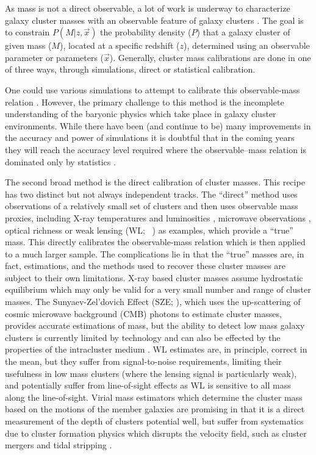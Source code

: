 \documentclass[fleqn,usenatbib]{mnras}
\begin{document}
As mass is not a direct observable, a lot of work is underway to characterize galaxy cluster masses with an observable feature of galaxy clusters . The goal is to constrain $P(M|z, \vec{x})$ the probability density ($P$) that a galaxy cluster of given mass ($M$), located at a specific redshift ($z$), determined using an observable parameter or parameters ($\vec{x}$). Generally, cluster mass calibrations are done in one of three ways, through simulations, direct or statistical calibration.

One could use various simulations to attempt to calibrate this observable-mass relation . However, the primary challenge to this method is the incomplete understanding of the baryonic physics which take place in galaxy cluster environments. While there have been (and continue to be) many improvements in the accuracy and power of simulations it is doubtful that in the coming years they will reach the accuracy level required where the observable--mass relation is dominated only by statistics \citep{Weinberg2013}. 
 
The second broad method is the direct calibration of cluster masses. This recipe has two distinct but not always independent tracks. The ``direct'' method uses observations of a relatively small set of clusters and then uses observable mass proxies, including X-ray temperatures and luminosities , microwave observations , optical richness  or weak lensing (WL; \eg\ \citealt{Rozo2010}) as examples, which provide a ``true'' mass. This directly calibrates the observable-mass relation which is then applied to a much larger sample. The complications lie in that the ``true'' masses are, in fact, estimations, and the methods used to recover these cluster masses are subject to their own limitations. X-ray based cluster masses assume hydrostatic equilibrium  which may only be valid for a very small number and range of cluster masses. The Sunyaev-Zel'dovich Effect (SZE; \citealt{Sunyaev1972}), which uses the up-scattering of cosmic microwave background (CMB) photons to estimate cluster masses, provides accurate estimations of mass, but the ability to detect low mass galaxy clusters is currently limited by technology  and can also be effected by the properties of the intracluster medium . WL estimates are, in principle, correct in the mean, but they suffer from signal-to-noise requirements, limiting their usefulness in low mass clusters (where the lensing signal is particularly weak), and potentially suffer from line-of-sight effects as WL is sensitive to all mass along the line-of-sight. Virial mass estimators which determine the cluster mass based on the motions of the member galaxies  are promising in that it is a direct measurement of the depth of clusters potential well, but suffer from systematics due to cluster formation physics which disrupts the velocity field, such as cluster mergers  and tidal stripping .
 
\end{document}

